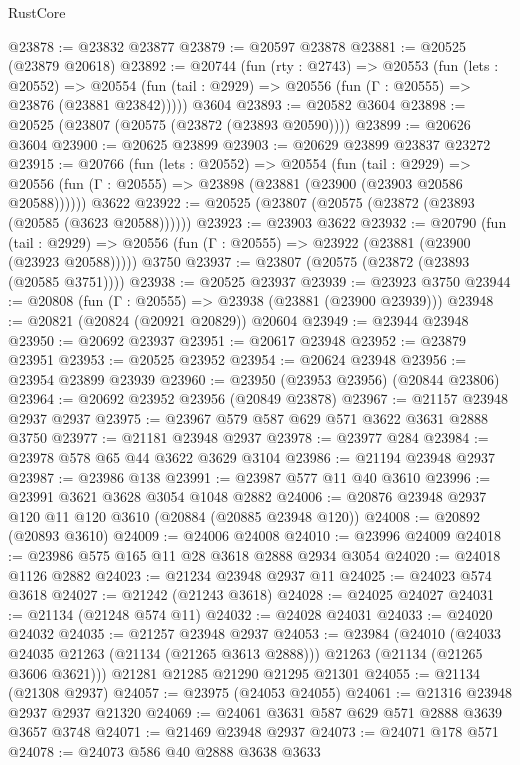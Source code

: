 \begin{lexlean}{RustCore}
\begin{coremodule}
@23878 := @23832 @23877
@23879 := @20597 @23878
@23881 := @20525 (@23879 @20618)
@23892 := @20744
    (fun (rty : @2743) =>
    @20553
      (fun (lets : @20552) =>
      @20554 (fun (tail : @2929) => @20556 (fun (Γ : @20555) => @23876 (@23881 @23842)))))
    @3604
@23893 := @20582 @3604
@23898 := @20525 (@23807 (@20575 (@23872 (@23893 @20590))))
@23899 := @20626 @3604
@23900 := @20625 @23899
@23903 := @20629 @23899 @23837 @23272
@23915 := @20766
    (fun (lets : @20552) =>
    @20554
      (fun (tail : @2929) =>
      @20556 (fun (Γ : @20555) => @23898 (@23881 (@23900 (@23903 @20586 @20588))))))
    @3622
@23922 := @20525 (@23807 (@20575 (@23872 (@23893 (@20585 (@3623 @20588))))))
@23923 := @23903 @3622
@23932 := @20790
    (fun (tail : @2929) => @20556 (fun (Γ : @20555) => @23922 (@23881 (@23900 (@23923 @20588)))))
    @3750
@23937 := @23807 (@20575 (@23872 (@23893 (@20585 @3751))))
@23938 := @20525 @23937
@23939 := @23923 @3750
@23944 := @20808 (fun (Γ : @20555) => @23938 (@23881 (@23900 @23939)))
@23948 := @20821 (@20824 (@20921 @20829)) @20604
@23949 := @23944 @23948
@23950 := @20692 @23937
@23951 := @20617 @23948
@23952 := @23879 @23951
@23953 := @20525 @23952
@23954 := @20624 @23948
@23956 := @23954 @23899 @23939
@23960 := @23950 (@23953 @23956) (@20844 @23806)
@23964 := @20692 @23952 @23956 (@20849 @23878)
@23967 := @21157 @23948 @2937 @2937
@23975 := @23967 @579 @587 @629 @571 @3622 @3631 @2888 @3750
@23977 := @21181 @23948 @2937
@23978 := @23977 @284
@23984 := @23978 @578 @65 @44 @3622 @3629 @3104
@23986 := @21194 @23948 @2937
@23987 := @23986 @138
@23991 := @23987 @577 @11 @40 @3610
@23996 := @23991 @3621 @3628 @3054 @1048 @2882
@24006 := @20876 @23948 @2937 @120 @11 @120 @3610 (@20884 (@20885 @23948 @120))
@24008 := @20892 (@20893 @3610)
@24009 := @24006 @24008
@24010 := @23996 @24009
@24018 := @23986 @575 @165 @11 @28 @3618 @2888 @2934 @3054
@24020 := @24018 @1126 @2882
@24023 := @21234 @23948 @2937 @11
@24025 := @24023 @574 @3618
@24027 := @21242 (@21243 @3618)
@24028 := @24025 @24027
@24031 := @21134 (@21248 @574 @11)
@24032 := @24028 @24031
@24033 := @24020 @24032
@24035 := @21257 @23948 @2937
@24053 := @23984
    (@24010
      (@24033 @24035 @21263 (@21134 (@21265 @3613 @2888)))
      @21263
      (@21134 (@21265 @3606 @3621)))
    @21281
    @21285
    @21290
    @21295
    @21301
@24055 := @21134 (@21308 @2937)
@24057 := @23975 (@24053 @24055)
@24061 := @21316 @23948 @2937 @2937 @21320
@24069 := @24061 @3631 @587 @629 @571 @2888 @3639 @3657 @3748
@24071 := @21469 @23948 @2937
@24073 := @24071 @178 @571
@24078 := @24073 @586 @40 @2888 @3638 @3633

\end{coremodule}
\end{lexlean}
